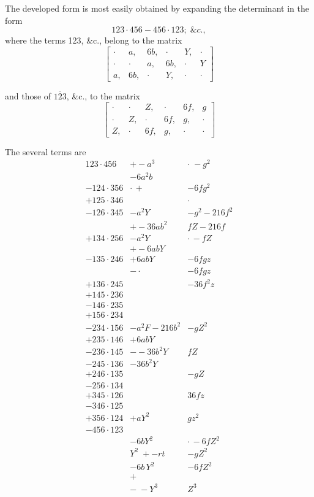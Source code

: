 \documentclass[11pt]{article}
\begin{document}
\medskip
The developed form is most easily obtained by expanding the
determinant in the form
\[
  123\cdot 456-456\cdot 123;\;\&c.,
\]
where the terms 123, \&c., belong to the matrix
\[
  \left[\begin{array}{cccccc}
  \cdot & a, & 6b, & \cdot & Y, & \cdot\\
  \cdot & \cdot & a, & 6b, & \cdot & Y\\
  a, & 6b, & \cdot & Y, & \cdot & \cdot
  \end{array}\right]
\]

\newpage
\noindent
and those of $\overline{123}$, \&c., to the matrix
\[
  \left[\begin{array}{cccccc}
  \cdot & \cdot & Z, & \cdot & 6f, & g\\
  \cdot & Z, & \cdot & 6f, & g, & \cdot\\
  Z, & \cdot & 6f, & g, & \cdot & \cdot
  \end{array}\right]
\]

\medskip
The several terms are
\[
\begin{array}{lcl}
123\cdot 456 & +-a^{3} & \cdot\;-g^{2}\\
& -6a^{2}b & \\
-124\cdot 356 & \cdot\,+ & -6fg^{2}\\
+125\cdot 346 & & \cdot\\
-126\cdot 345 & -a^{2}Y & -g^{2}-216f^{2}\\
& +-36ab^{2} & fZ-216f\\
+134\cdot 256 & -a^{2}Y & \cdot\,-fZ\\
& +-6abY & \\
-135\cdot 246 & +6abY & -6fgz\\
& -\cdot & -6fgz\\
+136\cdot 245 & & -36f^{2}z\\
+145\cdot 236 & & \\
-146\cdot 235 & & \\
+156\cdot 234 & & \\[2pt]
-234\cdot 156 & -a^{2}F-216b^{2} & -gZ^{2}\\
+235\cdot 146 & +6ab Y & \\
-236\cdot 145 & --36b^{2}Y & fZ\\
-245\cdot 136 & -36b^{2}Y & \\
+246\cdot 135 & & -gZ\\
-256\cdot 134 & & \\
+345\cdot 126 & & 36fz\\
-346\cdot 125 & & \\
+356\cdot 124 & +aY^{2} & gz^{2}\\
-456\cdot 123 & & \\
& -6bY^{2} & \cdot\,-6fZ^{2}\\
& Y^{2}\;+-rt & -gZ^{2}\\
& -6b\,Y^{2} & -6fZ^{2}\\
& + & \\
& -\;-Y^{3} & Z^{3}\\
\end{array}
\]
\end{document}
